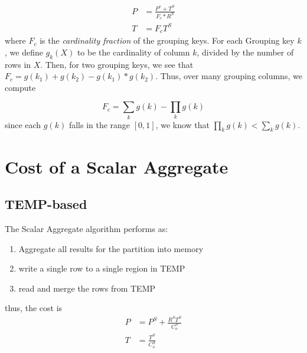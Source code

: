 \documentclass[10pt]{amsart}
\begin{document}
\begin{equation}
				\begin{aligned}
								P &= \frac{P^s +T^S}{F_c*R^S} \\
								T &= F_cT^S
				\end{aligned}
\end{equation}
where $F_c$ is the \emph{cardinality fraction} of the grouping keys. For each Grouping key $k$, we define $g_k(X)$ to be the cardinality of column $k$, divided by the number of rows in $X$. Then, for two grouping keys, we see that $F_c = g(k_1) + g(k_2) - g(k_1)*g(k_2)$. Thus, over many grouping columns, we compute 

\begin{equation*}
				F_c= \sum_k g(k) - \prod_k g(k)
\end{equation*}
since each $g(k)$ falls in the range $[0,1]$, we know that $\prod_k g(k) < \sum_k g(k)$.

\section{Cost of a Scalar Aggregate}
\subsection{TEMP-based}
The Scalar Aggregate algorithm performs as:
\begin{enumerate}
				\item Aggregate all results for the partition into memory
				\item write a single row to a single region in TEMP
				\item read and merge the rows from TEMP
\end{enumerate}

thus, the cost is
\begin{equation}
				\begin{aligned}
								P &= P^S + \frac{R^ST^S}{C_o^S} \\
								T &= \frac{T^S}{C_o^S}
				\end{aligned}
\end{equation}
\end{document}
